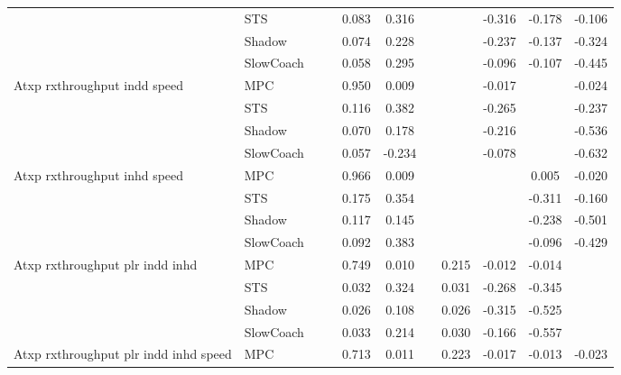 \begin{tabular}{|l|l|*{9}{c|}}
                              & STS &       &        &     0.083 &  0.316 &     &     &  -0.316 &  -0.178 &   -0.106 \\
                              & Shadow &       &        &     0.074 &  0.228 &     &     &  -0.237 &  -0.137 &   -0.324 \\
                              & SlowCoach &       &        &     0.058 &  0.295 &     &     &  -0.096 &  -0.107 &   -0.445 \\
\midrule
Atxp rxthroughput indd speed    & MPC &       &        &     0.950 &  0.009 &     &     &  -0.017 &      &   -0.024 \\
                              & STS &       &        &     0.116 &  0.382 &     &     &  -0.265 &      &   -0.237 \\
                              & Shadow &       &        &     0.070 &  0.178 &     &     &  -0.216 &      &   -0.536 \\
                              & SlowCoach &       &        &     0.057 & -0.234 &     &     &  -0.078 &      &   -0.632 \\
\midrule
Atxp rxthroughput inhd speed    & MPC &       &        &     0.966 &  0.009 &     &     &      &   0.005 &   -0.020 \\
                              & STS &       &        &     0.175 &  0.354 &     &     &      &  -0.311 &   -0.160 \\
                              & Shadow &       &        &     0.117 &  0.145 &     &     &      &  -0.238 &   -0.501 \\
                              & SlowCoach &       &        &     0.092 &  0.383 &     &     &      &  -0.096 &   -0.429 \\
\midrule
Atxp rxthroughput plr indd inhd    & MPC &       &        &     0.749 &  0.010 &     &  0.215 &  -0.012 &  -0.014 &       \\
                              & STS &       &        &     0.032 &  0.324 &     &  0.031 &  -0.268 &  -0.345 &       \\
                              & Shadow &       &        &     0.026 &  0.108 &     &  0.026 &  -0.315 &  -0.525 &       \\
                              & SlowCoach &       &        &     0.033 &  0.214 &     &  0.030 &  -0.166 &  -0.557 &       \\
\midrule
Atxp rxthroughput plr indd inhd speed    & MPC &       &        &     0.713 &  0.011 &     &  0.223 &  -0.017 &  -0.013 &   -0.023 \\

\end{tabular}
